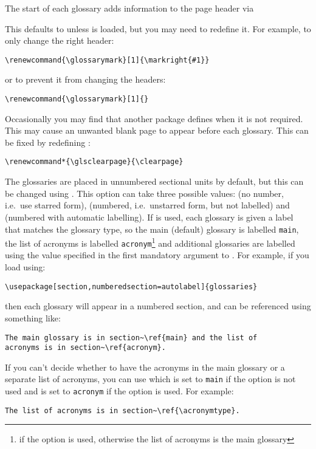 \documentclass{nlctdoc}
\begin{document}
\begin{description}
The start of each glossary adds information to the page header via
\begin{definition}[\DescribeMacro{\glossarymark}]
\end{definition}
This defaults to  unless  is loaded, but you may 
need to redefine it.
For example, to only change the right header:
\begin{verbatim}
\renewcommand{\glossarymark}[1]{\markright{#1}}
\end{verbatim}
or to prevent it from changing the headers:
\begin{verbatim}
\renewcommand{\glossarymark}[1]{}
\end{verbatim}

Occasionally you may find that another package defines 
 when it is not required. This may cause an 
unwanted blank page to appear before each glossary. This can
be fixed by redefining :
\begin{verbatim}
\renewcommand*{\glsclearpage}{\clearpage}
\end{verbatim}

\item[\pkgopt{numberedsection}]
The glossaries are placed in unnumbered sectional units by default,
but this can be changed using . This option can take
three possible values:  (no
number, i.e.\ use starred form), 
(numbered, i.e.\ unstarred form, but not labelled) and
 (numbered with automatic
labelling). If  is used, each
glossary is given a label that matches the glossary type, so the
main (default) glossary is labelled \texttt{main}, the list of
acronyms is labelled \texttt{acronym}\footnote{if the
 option is used, otherwise the list of
acronyms is the main glossary} and additional glossaries are labelled
using the value specified in the first mandatory argument to 
. For example, if you load 
using:
\begin{verbatim}
\usepackage[section,numberedsection=autolabel]{glossaries}
\end{verbatim}
then each glossary will appear in a numbered section, and can
be referenced using something like:
\begin{verbatim}
The main glossary is in section~\ref{main} and the list of
acronyms is in section~\ref{acronym}.
\end{verbatim}
If you can't decide whether to have the acronyms in the main
glossary or a separate list of acronyms, you can use
 which is set to \texttt{main} if the
 option is not used and is set to \texttt{acronym}
if the  option is used. For example:
\begin{verbatim}
The list of acronyms is in section~\ref{\acronymtype}.
\end{verbatim}


\end{description}
\end{document}
